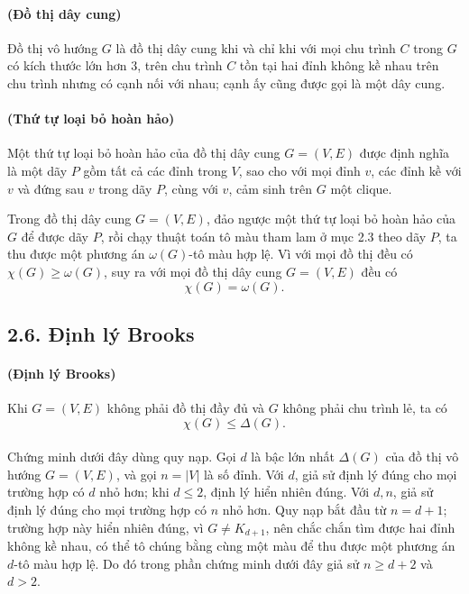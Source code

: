 \documentclass[11pt]{article}
\begin{document}
\paragraph{ (Đồ thị dây cung)}
Đồ thị vô hướng \(G\) là đồ thị dây cung khi và chỉ khi với mọi chu trình
\(C\) trong \(G\) có kích thước lớn hơn \(3\), trên chu trình \(C\) tồn tại
hai đỉnh không kề nhau trên chu trình nhưng có cạnh nối với nhau; cạnh ấy cũng
được gọi là một dây cung.

\paragraph{ (Thứ tự loại bỏ hoàn hảo)}
Một thứ tự loại bỏ hoàn hảo của đồ thị dây cung \(G=(V,E)\) được định nghĩa
là một dãy \(P\) gồm tất cả các đỉnh trong \(V\), sao cho với mọi đỉnh \(v\),
các đỉnh kề với \(v\) và đứng sau \(v\) trong dãy \(P\), cùng với \(v\), cảm
sinh trên \(G\) một clique.

Trong đồ thị dây cung \(G=(V,E)\), đảo ngược một thứ tự loại bỏ hoàn hảo của
\(G\) để được dãy \(P\), rồi chạy thuật toán tô màu tham lam ở mục 2.3 theo
dãy \(P\), ta thu được một phương án \(\omega(G)\)-tô màu hợp lệ. Vì với mọi
đồ thị đều có \(\chi(G)\ge\omega(G)\), suy ra với mọi đồ thị dây cung
\(G=(V,E)\) đều có
\[
  \chi(G)=\omega(G).
\]

\subsection*{2.6. Định lý Brooks}

\paragraph{ (Định lý Brooks)}
Khi \(G=(V,E)\) không phải đồ thị đầy đủ và \(G\) không phải chu trình lẻ, ta
có
\[
  \chi(G)\le \Delta(G).
\]

\paragraph{}
Chứng minh dưới đây dùng quy nạp. Gọi \(d\) là bậc lớn nhất \(\Delta(G)\) của
đồ thị vô hướng \(G=(V,E)\), và gọi \(n=|V|\) là số đỉnh. Với \(d\), giả sử
định lý đúng cho mọi trường hợp có \(d\) nhỏ hơn; khi \(d\le2\), định lý hiển
nhiên đúng. Với \(d,n\), giả sử định lý đúng cho mọi trường hợp có \(n\) nhỏ
hơn. Quy nạp bắt đầu từ \(n=d+1\); trường hợp này hiển nhiên đúng, vì
\(G\ne K_{d+1}\), nên chắc chắn tìm được hai đỉnh không kề nhau, có thể tô
chúng bằng cùng một màu để thu được một phương án \(d\)-tô màu hợp lệ. Do đó
trong phần chứng minh dưới đây giả sử \(n\ge d+2\) và \(d>2\).
\end{document}
